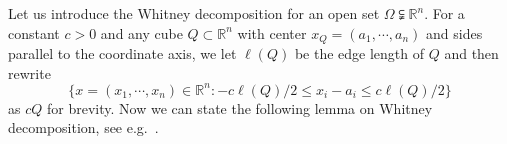 \documentclass[reqno,11pt]{amsart}
\makeatletter
\def\diam{{\mathop\mathrm{\,diam\,}}}
\numberwithin{equation}{section}
\theoremstyle{remark}
\newtheorem{rem}[thm]{Remark}%
\makeatother
\begin{document}

Let us introduce the Whitney decomposition for an open set $\Omega\subsetneqq\mathbb R^n$.  For a  constant $c>0$ and any cube $Q\subset\mathbb R^n$  with center $x_Q=(a_1,\cdots, a_n)$ and sides parallel to the coordinate axis, we let $\ell(Q)$ be the edge length of $Q$ and then  rewrite 
$$\{x=(x_1,\cdots,x_n)\in \mathbb R^n: -c\ell(Q)/2\le x_i-a_i\le c\ell(Q)/2\}$$
as $cQ$ for brevity. Now we can state the following lemma on Whitney decomposition, see e.g.\ \cite[Chapter VI]{S1970}.
\end{document}
